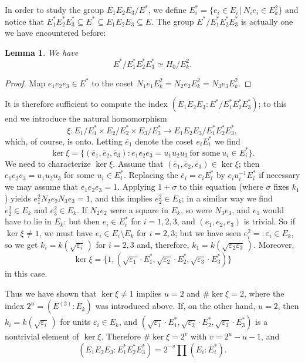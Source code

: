 \documentclass{amsart}
\newcommand{\eps}{\varepsilon}
\newcommand{\sth}{\,|\,}
\newcommand{\be}{\overline{e}}
\newcommand{\lra}{\longrightarrow}
\newtheorem{lemma}{Lemma}
\begin{document}
In order to study the group $E_1E_2E_3/E^*$, we define
$E_i^* = \{e_i \in E_i \sth N_ie_i \in E_k^2\}$ and notice that
$E_1^*E_2^*E_3^* \subseteq E^* \subseteq E_1E_2E_3 \subseteq E$.
The group $E^*/E_1^*E_2^*E_3^*$ is actually one we have encountered
before:

\begin{lemma}
We have
\begin{equation}\label{E2.11}
 E^*/E_1^*E_2^*E_3^* \simeq H_0/E_k^2.
\end{equation}
\end{lemma}

\begin{proof}
Map $e_1e_2e_3 \in E^*$ to the coset
$N_1e_1 E_k^2 = N_2e_2 E_k^2 = N_3e_3 E_k^2$.
\end{proof}

It is therefore sufficient to compute the index
$(E_1E_2E_3 : E^*/E_1^*E_2^*E_3^*)$; to this end we introduce
the natural homomorphism
$$ \xi: E_1/E_1^* \times E_2/E_2^* \times E_3/E_3^*
    \lra E_1E_2E_3 / E_1^*E_2^*E_3^*, $$
which, of course, is onto. Letting $\be_1$ denote the coset
$e_i E_i^*$ we find
$$ \ker \xi = \{(\be_1, \be_2, \be_3): e_1e_2e_3 = u_1u_2u_3 \
   \text{for some}\ u_i \in E_i^*\}.$$
We need to characterize $\ker \xi$. Assume that
$(\be_1, \be_2, \be_3) \in \ker \xi$; then $e_1e_2e_3 = u_1u_2u_3$
for some $u_i \in E_i^*$. Replacing the $\be_i = e_i E_i^*$
by $e_iu_i^{-1} E_i^*$ if necessary we may assume that
$e_1e_2e_3 = 1$. Applying $1+\sigma$ to this equation (where
$\sigma$ fixes $k_1$) yields $e_1^2 N_2e_2 N_3e_3 = 1$, and
this implies $e_2^2 \in E_k$; in a similar way we find $e_2^2 \in E_k$
and $e_3^2 \in E_k$. If $N_2e_2$ were a square in $E_k$, so were
$N_3e_3$, and $e_1$ would have to lie in $E_k$: but then
$e_i \in E_i^*$ for $i = 1, 2, 3$, and $(\be_1, \be_2, \be_3)$
is trivial. So if $\ker \xi \ne 1$, we must have
$e_i \in E_i \setminus E_k$ for $i = 2, 3$; but we have seen
$e_i^2 =: \eps_i \in E_k$, so we get $k_i = k(\sqrt{\eps_i}\,)$
for $i = 2, 3$ and, therefore, $k_1 = k(\sqrt{\eps_2\eps_3}\,)$.
Moreover,
$$ \ker \xi = \{1,
(\sqrt{\eps_1}\cdot E_1^*, \sqrt{\eps_2}\cdot E_2^*,
 \sqrt{\eps_3}\cdot E_3^*)\} $$
in this case.

Thus we have shown that $\ker \xi \ne 1$ implies $u=2$ and
$\# \ker \xi = 2$, where the index $2^u = (E^{(2)}:E_k)$ was
introduced above. If, on the other hand, $u = 2$, then
$k_i = k(\sqrt{\eps_i}\,)$ for units $\eps_i \in E_k$, and
$(\sqrt{\eps_1}\cdot E_1^*, \sqrt{\eps_2}\cdot E_2^*,
 \sqrt{\eps_3}\cdot E_3^*)$ is a nontrivial element of
$\ker \xi$. Therefore $\# \ker \xi = 2^v$ with
$v = 2^u - u - 1$, and
\begin{equation}\label{E2.12}
  (E_1E_2E_3 : E_1^* E_2^* E_3^*) = 2^{-v} \prod (E_i : E_i^*).
\end{equation}
\end{document}
